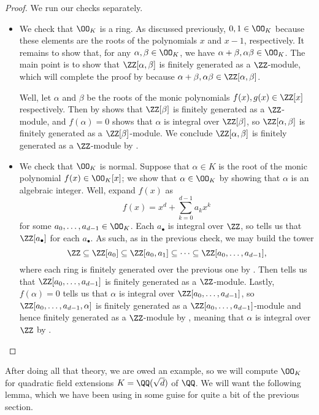 \documentclass[../notes.tex]{subfiles}
\begin{document}
\begin{proof}
	We run our checks separately.
	\begin{itemize}
		\item We check that $\OO_K$ is a ring. As discussed previously, $0,1\in\OO_K$ because these elements are the roots of the polynomials $x$ and $x-1$, respectively. It remains to show that, for any $\alpha,\beta\in\OO_K$, we have $\alpha+\beta,\alpha\beta\in\OO_K$. The main point is to show that $\ZZ[\alpha,\beta]$ is finitely generated as a $\ZZ$-module, which will complete the proof by  because $\alpha+\beta,\alpha\beta\in\ZZ[\alpha,\beta]$.
	
		Well, let $\alpha$ and $\beta$ be the roots of the monic polynomials $f(x),g(x)\in\ZZ[x]$ respectively. Then by  shows that $\ZZ[\beta]$ is finitely generated as a $\ZZ$-module, and $f(\alpha)=0$ shows that $\alpha$ is integral over $\ZZ[\beta]$, so $\ZZ[\alpha,\beta]$ is finitely generated as a $\ZZ[\beta]$-module. We conclude $\ZZ[\alpha,\beta]$ is finitely generated as a $\ZZ$-module by .

		\item We check that $\OO_K$ is normal. Suppose that $\alpha\in K$ is the root of the monic polynomial $f(x)\in\OO_K[x]$; we show that $\alpha\in\OO_K$ by showing that $\alpha$ is an algebraic integer. Well, expand $f(x)$ as
		\[f(x)=x^d+\sum_{k=0}^{d-1}a_kx^k\]
		for some $a_0,\ldots,a_{d-1}\in\OO_K$. Each $a_\bullet$ is integral over $\ZZ$, so  tells us that $\ZZ[a_\bullet]$ for each $a_\bullet$. As such, as in the previous check, we may build the tower
		\[\ZZ\subseteq\ZZ[a_0]\subseteq\ZZ[a_0,a_1]\subseteq\cdots\subseteq\ZZ[a_0,\ldots,a_{d-1}],\]
		where each ring is finitely generated over the previous one by . Then  tells us that $\ZZ[a_0,\ldots,a_{d-1}]$ is finitely generated as a $\ZZ$-module. Lastly, $f(\alpha)=0$ tells us that $\alpha$ is integral over $\ZZ[a_0,\ldots,a_{d-1}]$, so $\ZZ[a_0,\ldots,a_{d-1},\alpha]$ is finitely generated as a $\ZZ[a_0,\ldots,a_{d-1}]$-module and hence finitely generated as a $\ZZ$-module by , meaning that $\alpha$ is integral over $\ZZ$ by .
		\qedhere
	\end{itemize}
\end{proof}
After doing all that theory, we are owed an example, so we will compute $\OO_K$ for quadratic field extensions $K=\QQ(\sqrt d)$ of $\QQ$. We will want the following lemma, which we have been using in some guise for quite a bit of the previous section.
\end{document}
